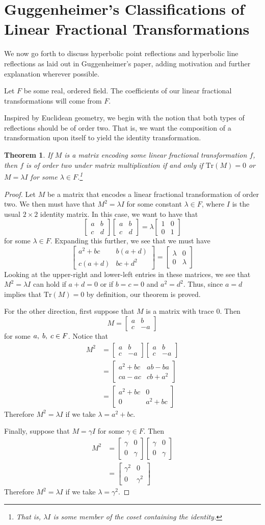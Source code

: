 \documentclass[12pt]{article}
\newcommand{\Tr}{\text{Tr}}
\newcommand{\ttc}{, \hspace{1mm}}
\newcommand{\lftmat}[4]{\begin{bmatrix} {#1} & {#2} \\ {#3} & {#4} \end{bmatrix}}
\newcommand{\stanlftmat}{\lftmat{a}{b}{c}{d}}
\theoremstyle{plain}
\newtheorem{theorem}{Theorem}[section]
\theoremstyle{definition}
\begin{document}
\section{Guggenheimer's Classifications of Linear Fractional Transformations}

\hspace{10mm} We now go forth to discuss hyperbolic point reflections and hyperbolic line reflections as laid out in Guggenheimer's paper, adding motivation and further explanation wherever possible. 

Let $F$ be some real, ordered field. The coefficients of our linear fractional transformations will come from $F$.

Inspired by Euclidean geometry, we begin with the notion that both types of reflections should be of order two. That is, we want the composition of a transformation upon itself to yield the identity transformation. 

\begin{theorem}
If $M$ is a matrix encoding some linear fractional transformation $f$, then $f$ is of order two under matrix multiplication if and only if $\Tr(M) = 0$ or $M = \lambda I$ for some $\lambda \in F$.\footnote{That is, $\lambda I$ is some member of the coset containing the identity.}
\end{theorem}

\begin{proof}
 Let $M$ be a matrix that encodes a linear fractional transformation of order two. We then must have that $M^2 = \lambda I$ for some constant $\lambda \in F$, where $I$ is the usual $2 \times 2$ identity matrix. In this case, we want to have that 
	\[
		\stanlftmat \stanlftmat = \lambda \lftmat{1}{0}{0}{1}
	\]
for some $\lambda \in F$. Expanding this further, we see that we must have 
	\[
		\lftmat{a^2 + bc}{b(a+d)}{c(a+d)}{bc+d^2} =  \lftmat{\lambda}{0}{0}{\lambda}
	\]
Looking at the upper-right and lower-left entries in these matrices, we see that $M^2 = \lambda I$ can hold if $a + d = 0$ or if $b = c = 0$ and $a^2 = d^2$. Thus, since $a = d$ implies that $\Tr(M) = 0$ by definition, our theorem is proved.

For the other direction, first suppose that $M$ is a matrix with trace 0. Then
\[M = \lftmat{a}{b}{c}{-a}\]
for some $a \ttc b \ttc c \in F$. Notice that
\begin{align*}
M^2 & = \lftmat{a}{b}{c}{-a} \lftmat{a}{b}{c}{-a} \\[2ex]
& = \lftmat{a^2+bc}{ab - ba}{ca - ac}{cb+a^2} \\[2ex]
& = \lftmat{a^2+bc}{0}{0}{a^2 + bc}
\end{align*}
Therefore $M^2 = \lambda I$ if we take $\lambda = a^2 + bc$.

Finally, suppose that $M = \gamma I$ for some $\gamma \in F$. Then
\begin{align*}
M^2 & = \lftmat{\gamma}{0}{0}{\gamma} \lftmat{\gamma}{0}{0}{\gamma} \\[2ex]
& = \lftmat{\gamma^2}{0}{0}{\gamma^2}
\end{align*}
Therefore $M^2 = \lambda I$ if we take $\lambda = \gamma^2$.
\end{proof}
\end{document}
